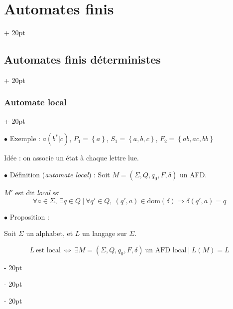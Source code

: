 \documentclass[a4paper, 12pt, twoside]{article}
\newcommand{\set}[1]{\left\{ #1 \right\}}
\newcommand{\ssi}{\ \Leftrightarrow \ }
\newcommand{\ind}[1][20pt]{\advance\leftskip + #1}
\newcommand{\deind}[1][20pt]{\advance\leftskip - #1}
\newenvironment{indt}[2][20pt]{#2 \par \ind[#1]}{\par \deind} %
\begin{document}
\begin{indt}{\section{Automates finis}}
\begin{indt}{\subsection{Automates finis déterministes}}
\begin{indt}{\subsubsection{Automate local}}
                \vspace{12pt}
                
                $\bullet$ Exemple : $a(b^* | c)$, $P_1 = \set a$, $S_1 = \set{a, b, c}$, $F_2 = \set{ab, ac, bb}$

                Idée : on associe un état à chaque lettre lue.

                \begin{center}
                \end{center}

                \vspace{12pt}
                
                $\bullet$ Définition (\emph{automate local}) : Soit $M = (\Sigma, Q, q_0, F, \delta)$ un AFD.

                $M'$ est dit \emph{local} ssi
                \[
                    \forall a \in \Sigma,\ \exists q \in Q\ |\ \forall q' \in Q,\
                    (q', a) \in \mathrm{dom}(\delta) \Rightarrow \delta(q', a) = q
                \]

                \vspace{12pt}
                
                $\bullet$ Proposition :
                \begin{emphBox}
                    Soit $\Sigma$ un alphabet, et $L$ un langage sur $\Sigma$.

                    \[
                        L\ \text{est local}
                        \ssi
                        \exists M = (\Sigma, Q, q_0, F, \delta)\ \text{un AFD local}\ |\
                        L(M) = L
                    \]
                \end{emphBox}


\end{indt}
\end{indt}
\end{indt}
\end{document}
